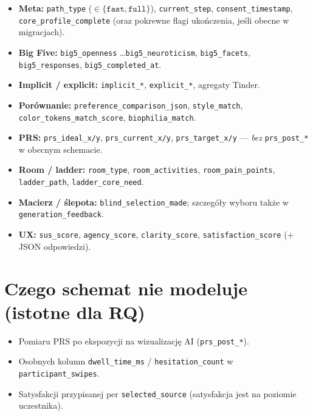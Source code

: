 \begin{itemize}
  \item \textbf{Meta:} \texttt{path\_type} ($\in\{\texttt{fast},\texttt{full}\}$), \texttt{current\_step}, \texttt{consent\_timestamp}, \texttt{core\_profile\_complete} (oraz pokrewne flagi ukończenia, jeśli obecne w migracjach).
  \item \textbf{Big Five:} \texttt{big5\_openness} \ldots \texttt{big5\_neuroticism}, \texttt{big5\_facets}, \texttt{big5\_responses}, \texttt{big5\_completed\_at}.
  \item \textbf{Implicit / explicit:} \texttt{implicit\_*}, \texttt{explicit\_*}, agregaty Tinder.
  \item \textbf{Porównanie:} \texttt{preference\_comparison\_json}, \texttt{style\_match}, \texttt{color\_tokens\_match\_score}, \texttt{biophilia\_match}.
  \item \textbf{PRS:} \texttt{prs\_ideal\_x/y}, \texttt{prs\_current\_x/y}, \texttt{prs\_target\_x/y} --- \emph{bez} \texttt{prs\_post\_*} w obecnym schemacie.
  \item \textbf{Room / ladder:} \texttt{room\_type}, \texttt{room\_activities}, \texttt{room\_pain\_points}, \texttt{ladder\_path}, \texttt{ladder\_core\_need}.
  \item \textbf{Macierz / ślepota:} \texttt{blind\_selection\_made}; szczegóły wyboru także w \texttt{generation\_feedback}.
  \item \textbf{UX:} \texttt{sus\_score}, \texttt{agency\_score}, \texttt{clarity\_score}, \texttt{satisfaction\_score} (+ JSON odpowiedzi).
\end{itemize}

\section{Czego schemat nie modeluje (istotne dla RQ)}
\label{app:a:sec:luki}

\begin{itemize}
  \item Pomiaru PRS po ekspozycji na wizualizację AI (\texttt{prs\_post\_*}).
  \item Osobnych kolumn \texttt{dwell\_time\_ms} / \texttt{hesitation\_count} w \texttt{participant\_swipes}.
  \item Satysfakcji przypisanej per \texttt{selected\_source} (satysfakcja jest na poziomie uczestnika).
\end{itemize}

